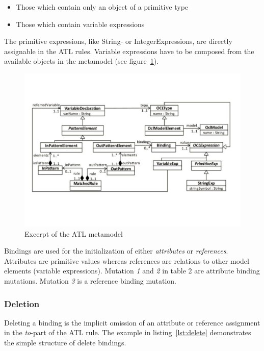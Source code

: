 \documentclass{llncs}
\begin{document}
\begin{itemize}
	\item Those which contain only an object of a primitive type
	\item Those which contain variable expressions
\end{itemize}

The primitive expressions, like String- or IntegerExpressions, are directly assignable in the ATL rules. Variable expressions have to be composed from the available objects in the metamodel (see figure~\ref{fig:atl_metamodel_excerpt}).

\begin{figure}
	\centering
	\includegraphics[angle=0,width=1\textwidth,natwidth=610,natheight=642]{figures/ATL_Metamodel_Excerpt}
	\caption{Excerpt of the ATL metamodel}
	\label{fig:atl_metamodel_excerpt}
\end{figure}

Bindings are used for the initialization of either \emph{attributes} or \emph{references}. Attributes are primitive values whereas references are relations to other model elements (variable expressions). Mutation \emph{1} and \emph{2} in table 2 are attribute binding mutations. Mutation \emph{3} is a reference binding mutation.

\subsubsection{Deletion}

Deleting a binding is the implicit omission of an attribute or reference assignment in the \emph{to}-part of the ATL rule. The example in listing~\ref{lst:delete} demonstrates the simple structure of delete bindings.
\end{document}
